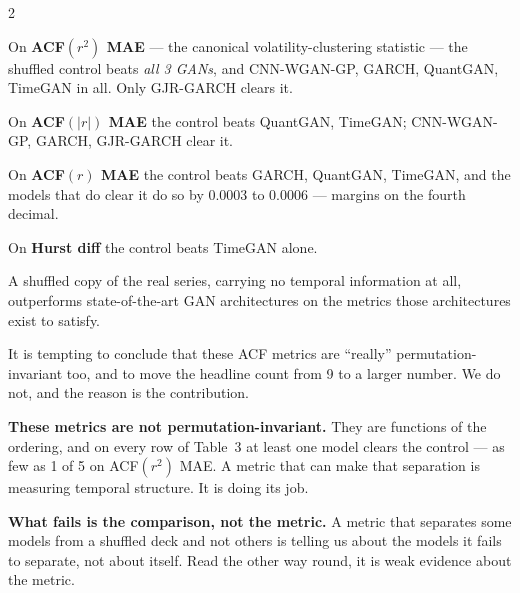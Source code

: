 \documentclass[10pt]{article}
\newcommand{\purplebox}[2]{\begin{tcolorbox}[mybox={Purple}{LBg},title={#1}]#2\end{tcolorbox}}
\begin{document}
\begin{multicols}{2}
{\smallskip
{}

\smallskip
On \textbf{ACF$(r^2)$ MAE} --- the canonical volatility-clustering statistic --- the shuffled control beats \emph{all 3 GANs}, and CNN-WGAN-GP, GARCH, QuantGAN, TimeGAN in all. Only GJR-GARCH clears it.

On \textbf{ACF$(|r|)$ MAE} the control beats QuantGAN, TimeGAN; CNN-WGAN-GP, GARCH, GJR-GARCH clear it.

On \textbf{ACF$(r)$ MAE} the control beats GARCH, QuantGAN, TimeGAN, and the models that do clear it do so by 0.0003 to 0.0006 --- margins on the fourth decimal.

On \textbf{Hurst diff} the control beats TimeGAN alone.

\smallskip
A shuffled copy of the real series, carrying no temporal information at all, outperforms state-of-the-art GAN architectures on the metrics those architectures exist to satisfy.}

\columnbreak

\purplebox{What This Does and Does Not License}{%
It is tempting to conclude that these ACF metrics are ``really'' permutation-invariant too, and to move the headline count from 9 to a larger number. We do not, and the reason is the contribution.

\smallskip
\textbf{These metrics are not permutation-invariant.} They are functions of the ordering, and on every row of Table~3 at least one model clears the control --- as few as 1 of 5 on ACF$(r^2)$ MAE. A metric that can make that separation is measuring temporal structure. It is doing its job.

\smallskip
\textbf{What fails is the comparison, not the metric.} A metric that separates some models from a shuffled deck and not others is telling us about the models it fails to separate, not about itself. Read the other way round, it is weak evidence about the metric.

}
\end{multicols}
\end{document}
